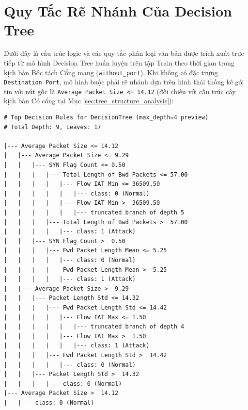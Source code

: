 
\chapter{Quy Tắc Rẽ Nhánh Của Decision Tree}
\label{app:tree_rules}

Dưới đây là cấu trúc logic và các quy tắc phân loại văn bản được trích xuất trực tiếp từ mô hình Decision Tree huấn luyện trên tập Train theo thời gian trong kịch bản Bóc tách Cổng mạng (\texttt{without\_port}). Khi không có đặc trưng \texttt{Destination Port}, mô hình buộc phải rẽ nhánh dựa trên hình thái thống kê gói tin với nút gốc là \texttt{Average Packet Size <= 14.12} (đối chiếu với cấu trúc cây kịch bản Có cổng tại Mục \ref{sec:tree_structure_analysis}):

\begin{lstlisting}[caption={Toàn văn quy tắc rẽ nhánh cấp cao của Decision Tree (max\_depth=4)}]
# Top Decision Rules for DecisionTree (max_depth=4 preview)
# Total Depth: 9, Leaves: 17

|--- Average Packet Size <= 14.12
|   |--- Average Packet Size <= 9.29
|   |   |--- SYN Flag Count <= 0.50
|   |   |   |--- Total Length of Bwd Packets <= 57.00
|   |   |   |   |--- Flow IAT Min <= 36509.50
|   |   |   |   |   |--- class: 0 (Normal)
|   |   |   |   |--- Flow IAT Min >  36509.50
|   |   |   |   |   |--- truncated branch of depth 5
|   |   |   |--- Total Length of Bwd Packets >  57.00
|   |   |   |   |--- class: 1 (Attack)
|   |   |--- SYN Flag Count >  0.50
|   |   |   |--- Fwd Packet Length Mean <= 5.25
|   |   |   |   |--- class: 0 (Normal)
|   |   |   |--- Fwd Packet Length Mean >  5.25
|   |   |   |   |--- class: 1 (Attack)
|   |--- Average Packet Size >  9.29
|   |   |--- Packet Length Std <= 14.32
|   |   |   |--- Fwd Packet Length Std <= 14.42
|   |   |   |   |--- Flow IAT Max <= 1.50
|   |   |   |   |   |--- truncated branch of depth 4
|   |   |   |   |--- Flow IAT Max >  1.50
|   |   |   |   |   |--- class: 1 (Attack)
|   |   |   |--- Fwd Packet Length Std >  14.42
|   |   |   |   |--- class: 0 (Normal)
|   |   |--- Packet Length Std >  14.32
|   |   |   |--- class: 0 (Normal)
|--- Average Packet Size >  14.12
|   |--- class: 0 (Normal)
\end{lstlisting}
